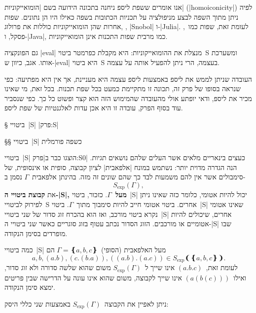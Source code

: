 אנו אומרים ששפת ליספ ניחנה בתכונה הידועה בשם \ע|הומואייקוניות|
(\E|homoiconicity|) לפיה ניתן מתוך השפה לבצע מניפולציה על תכניות הכתובות בשפה
כאילו היו הן נתונים. שפות אחרות שהן הומואייקוניות כוללות את פרולוג, , \E|Snobol| ו-\E|Julia|. לעומת זאת, שפות כמו~\CPL, פסקל,
ו-\E|Java|, כמו מרבית שפות התכנות אינן הומואייקוניות.

גם הפונקציה \E|eval| מנצלת את ההומואייקוניות: היא מקבלת כפרמטר ביטוי~S ומשערכת
אותו. אגב, כיוון ש-\E|eval| היא ביטוי~S בעצמה, הרי ניתן להפעיל אותה על עצמה.

העובדה שניתן לממש את ליספ באמצעות ליספ עצמה היא מעניינת, אך אין היא מפתיעה: כפי
שנראה בסופו של פרק זה, תכונה זו מתקיימת כמעט בכל שפת תכנות. בכל זאת, מי שאינו
מכיר את ליספ, ודאי יופתע אולי מהעובדה שהמימוש הזה הוא קצר ופשוט כל כך. כפי
שנסביר עוד בסוף הפרק, עובדה זו היא אכן עדות לאלגנטיות של שפת ליספ.

§ ביטויי~\E|S|
|פרק:S|

§§ ביטויי~\E|S| כשפה פורמלית

\newcommand\SX{\ensuremath{S_{\text{exp}}}}

ביטויי~\E|S| הוצגו כבר ב|פרק:S0| כעצים בינאריים מלאים אשר העלים שלהם נושאים
תגיות. הנה הגדרה מדוית יותר: נשתמש במונח \ע|אלפאבית| לציון קבוצה,  סופית או
אינסופית, של סימבולים אשר אין להם משמעות לבד כך שהם שונים זה מזה. בהינתן
אלפאבית~$Γ$ נסמן ב-\[
  \SX(Γ),
\]
את \textbf{קבוצת ביטויי ה-\E|S|, מעל~$Γ$}. כזכור, ביטוי~\E|S|
יכול להיות אטומי, כלומר כזה שאינו ניתן לפירוק לביטויי~S אחרים. ביטוי אטומי חייב
להיות סימבוך מתוך~$Γ$. ביטוי~\E|S| שאינו אטומי נקרא ביטוי מורכב, ואז הוא בהכרח
זוג סדור של שני ביטויי~\E|S| אחרים, שיכולים להיות אטומיים או מורכבים. הזוג
הסדור נכתב עטוף בזוג סוגריים כאשר שני ביטויי ה-\E|S| שבו מופרדים בסימן הנקודה.

כמה ביטויי~\E|S| מעל האלפאבית (הסופי)~$Γ=❴a,b,c❵$ הם \[
  a,b,(a.b),(c.(b.a)),((a.b).(a.c))∈\SX❨❴a,b,c❵❩.
\] לעומת זאת,~$(a.b.c)$ אינו שייך ל~$\SX(Γ)$ משום שהוא שלשה סדורה ולא זוג סדור,
ואילו~$(a(b(c)))$ אינו שייך לקבוצה, משום שהוא אינו עונה על הדרישה שבין פריטים
ימצא סימן הנקודה.

ניתן לאפיין את הקבוצה~$\SX(Γ)$ באמצעות שני כללי היסק:

